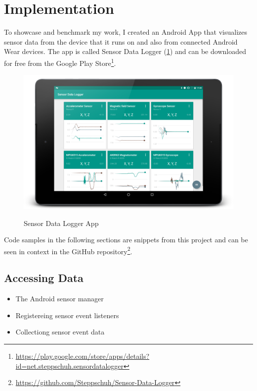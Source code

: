 \section{Implementation}
\label{sec:implementation}

To showcase and benchmark my work, I created an Android App that visualizes sensor data from the device that it runs on and also from connected Android Wear devices.
The app is called Sensor Data Logger (\ref{fig:sensorDataLoggerApp}) and can be downloaded for free from the Google Play Store\footnote{\href{https://play.google.com/store/apps/details?id=net.steppschuh.sensordatalogger}{https://play.google.com/store/apps/details?id=net.steppschuh.sensordatalogger}}.

\begin{figure}[H]
	\href{https://github.com/Steppschuh/Sensor-Data-Logger}{
		\includegraphics[width=\linewidth]{images/app/charts_landscape_framed.png}
	}
	\caption[Caption for Sensor Data Logger App]{Sensor Data Logger App}
	\label{fig:sensorDataLoggerApp}
\end{figure}

Code samples in the following sections are snippets from this project and can be seen in context in the GitHub repository\footnote{\href{https://github.com/Steppschuh/Sensor-Data-Logger}{https://github.com/Steppschuh/Sensor-Data-Logger}}.

\clearpage

\subsection{Accessing Data}
\begin{itemize}[noitemsep]
	\item The Android sensor manager
	\item Registereing sensor event listeners
	\item Collectiong sensor event data
\end{itemize}

